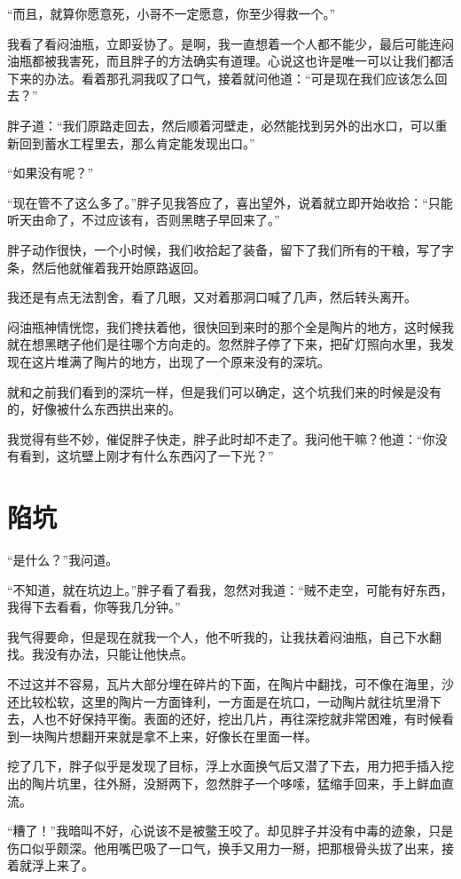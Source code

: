 “而且，就算你愿意死，小哥不一定愿意，你至少得救一个。”

我看了看闷油瓶，立即妥协了。是啊，我一直想着一个人都不能少，最后可能连闷油瓶都被我害死，而且胖子的方法确实有道理。心说这也许是唯一可以让我们都活下来的办法。看着那孔洞我叹了口气，接着就问他道：“可是现在我们应该怎么回去？”

胖子道：“我们原路走回去，然后顺着河壁走，必然能找到另外的出水口，可以重新回到蓄水工程里去，那么肯定能发现出口。”

“如果没有呢？”

“现在管不了这么多了。”胖子见我答应了，喜出望外，说着就立即开始收拾：“只能听天由命了，不过应该有，否则黑瞎子早回来了。”

胖子动作很快，一个小时候，我们收拾起了装备，留下了我们所有的干粮，写了字条，然后他就催着我开始原路返回。

我还是有点无法割舍，看了几眼，又对着那洞口喊了几声，然后转头离开。

闷油瓶神情恍惚，我们搀扶着他，很快回到来时的那个全是陶片的地方，这时候我就在想黑瞎子他们是往哪个方向走的。忽然胖子停了下来，把矿灯照向水里，我发现在这片堆满了陶片的地方，出现了一个原来没有的深坑。

就和之前我们看到的深坑一样，但是我们可以确定，这个坑我们来的时候是没有的，好像被什么东西拱出来的。

我觉得有些不妙，催促胖子快走，胖子此时却不走了。我问他干嘛？他道：“你没有看到，这坑壁上刚才有什么东西闪了一下光？”

\chapter{陷坑}

“是什么？”我问道。

“不知道，就在坑边上。”胖子看了看我，忽然对我道：“贼不走空，可能有好东西，我得下去看看，你等我几分钟。”

我气得要命，但是现在就我一个人，他不听我的，让我扶着闷油瓶，自己下水翻找。我没有办法，只能让他快点。

不过这并不容易，瓦片大部分埋在碎片的下面，在陶片中翻找，可不像在海里，沙还比较松软，这里的陶片一方面锋利，一方面是在坑口，一动陶片就往坑里滑下去，人也不好保持平衡。表面的还好，挖出几片，再往深挖就非常困难，有时候看到一块陶片想翻开来就是拿不上来，好像长在里面一样。

挖了几下，胖子似乎是发现了目标，浮上水面换气后又潜了下去，用力把手插入挖出的陶片坑里，往外掰，没掰两下，忽然胖子一个哆嗦，猛缩手回来，手上鲜血直流。

“糟了！”我暗叫不好，心说该不是被鳖王咬了。却见胖子并没有中毒的迹象，只是伤口似乎颇深。他用嘴巴吸了一口气，换手又用力一掰，把那根骨头拔了出来，接着就浮上来了。

